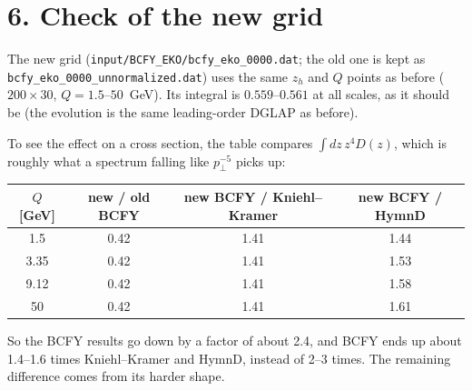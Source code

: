 \documentclass[12pt]{article}
\begin{document}
\section*{6. Check of the new grid}

The new grid (\texttt{input/BCFY\_EKO/bcfy\_eko\_0000.dat}; the old one is kept as
\texttt{bcfy\_eko\_0000\_unnormalized.dat}) uses the same $z_h$ and $Q$ points as before
($200\times30$, $Q=1.5$--$50$~GeV). Its integral is $0.559$--$0.561$ at all scales, as it should
be (the evolution is the same leading-order DGLAP as before).

To see the effect on a cross section, the table compares $\int dz\,z^4D(z)$, which is roughly
what a spectrum falling like $p_\perp^{-5}$ picks up:
\begin{center}
\begin{tabular}{cccc}
\toprule
$Q$ [GeV] & new / old BCFY & new BCFY / Kniehl--Kramer & new BCFY / HymnD \\
\midrule
1.5  & 0.42 & 1.41 & 1.44 \\
3.35 & 0.42 & 1.41 & 1.53 \\
9.12 & 0.42 & 1.41 & 1.58 \\
50   & 0.42 & 1.41 & 1.61 \\
\bottomrule
\end{tabular}
\end{center}
So the BCFY results go down by a factor of about 2.4, and BCFY ends up about 1.4--1.6 times
Kniehl--Kramer and HymnD, instead of 2--3 times. The remaining difference comes from its harder
shape.
\end{document}
